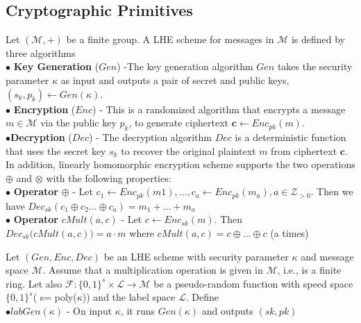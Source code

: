 \subsection{Cryptographic Primitives}
Let $(\mathcal{M}, +)$ be a finite group. A \textsf{LHE} scheme
for messages in $\mathcal{M}$ is defined  by three algorithms \\
$\bullet$ \textbf{Key Generation }($Gen$) -The key generation algorithm $Gen$ takes the security parameter $\kappa$ as input and outputs
a pair of secret and public keys, $(s_k, p_k) \leftarrow Gen(\kappa)$.\\
$\bullet$ \textbf{Encryption} ($Enc$) - This is a randomized algorithm that encrypts a message $m \in \mathcal{M}$ via the public key $p_k$, to generate ciphertext $\mathbf{c} \leftarrow Enc_{pk}(m)$.\\
$\bullet$\textbf{Decryption} ($Dec$) - The decryption algorithm $Dec$ is a deterministic function that uses the secret key $s_k$ to
recover the original plaintext $m$ from ciphertext $\mathbf{c}$.
\\
In addition, linearly homomorphic encryption scheme supports the two operations $\oplus$ and $\otimes$ with the following properties:
\\$\bullet$ \textbf{Operator} $\oplus$ - Let $c_1 \leftarrow Enc_{pk}(m1), \ldots, c_a \leftarrow Enc_{pk}(m_a), a \in \mathcal{Z}_{>0}$. Then we have  $Dec_{sk}(c_1\oplus c_2 ...\oplus c_a)=    m_1 + \ldots   + m_a$  \\
$\bullet$ \textbf{Operator} $cMult(a,c)$ - Let $c\leftarrow  Enc_{sk}(m)$. Then  \\ $Dec_{sk}\big(cMult(a,c)\big)=a\cdot m$ where $cMult(a,c)=c\oplus \ldots \oplus c$ (a times) 


Let $(Gen,Enc,Dec)$ be an \textsf{LHE} scheme with security parameter $\kappa$ and message space $\mathcal{M}$. Assume that a multiplication operation is given in $\mathcal{M}$, i.e., is a finite ring. Let also $\mathcal{F}:\{0,1\}^s \times \mathcal{L}\rightarrow \mathcal{M}$ be a pseudo-random function with speed space $\{0,1\}^s$( s= poly($\kappa $)) and the label space $\mathcal{L}$. Define
\\
 $\bullet labGen(\kappa)$ - On input $\kappa$, it runs $Gen(\kappa)$ and outputs $(sk,pk)$

